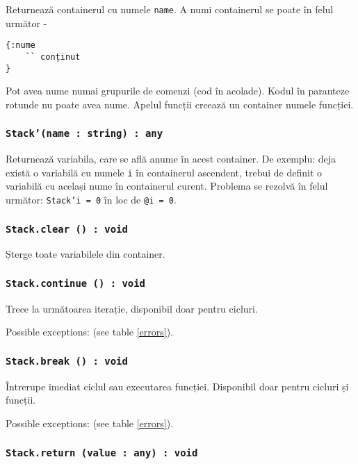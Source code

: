 Returnează containerul cu numele \texttt{name}. A numi containerul se poate în felul următor -
\begin{verbatim}
{:nume
	`` conținut
}
\end{verbatim}
Pot avea nume numai grupurile de comenzi (cod în acolade). Kodul în paranteze rotunde nu poate avea nume. Apelul funcții creează un container numele funcției.


\subsubsection{\texttt{Stack'(name : string) : any}}

Returnează variabila, care se află anume în acest container. De exemplu: deja există o variabilă cu numele \texttt{i} în containerul ascendent, trebui de definit o variabilă cu același nume în containerul curent. Problema se rezolvă în felul următor: \texttt{Stack'i = 0} în loc de \texttt{@i = 0}.

\subsubsection{\texttt{Stack.clear () : void}}

Șterge toate variabilele din container.

\subsubsection{\texttt{Stack.continue () : void}}

Trece la următoarea iterație, disponibil doar pentru cicluri.

Possible exceptions:  (see table \ref{errors}).

\subsubsection{\texttt{Stack.break () : void}}

Întrerupe imediat ciclul sau executarea funcției. Disponibil doar pentru cicluri și funcții.

Possible exceptions:  (see table \ref{errors}).

\subsubsection{\texttt{Stack.return (value : any) : void}}

